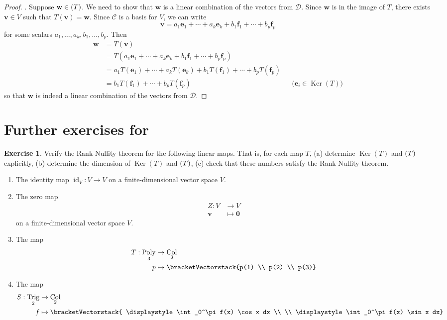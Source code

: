 \documentclass[a4paper,11pt]{book}
\theoremstyle{definition}
\newtheorem{exercise}{Exercise}
\newcommand{\ve}[1]{\mathbf{#1}}
\newcommand{\basis}[1]{{\mathcal #1}}
\newcommand{\cvector}[1]{\bracketVectorstack{#1}}
\newcommand{\furtherexercises}{\section*{Further exercises for \thesection}}
\DeclareMathOperator{\Poly}{Poly}
\DeclareMathOperator{\Trig}{Trig}
\DeclareMathOperator{\Col}{Col}
\DeclareMathOperator{\id}{id}
\DeclareMathOperator{\Ker}{Ker}
\let\Im\relax
\DeclareMathOperator{\Im}{Im} %
\begin{document}
\begin{proof}
\noindent {\em $\basis{D}$ spans $W$}. Suppose $\ve{w} \in \Im(T)$. We need to show that $\ve{w}$ is a linear combination of the vectors from $\basis{D}$. Since $\ve{w}$ is in the image of $T$, there exists $\ve{v} \in V$ such that $T(\ve{v}) = \ve{w}$. Since $\basis{C}$ is a basis for $V$, we can write
\[
 \ve{v} = a_1 \ve{e}_1 + \cdots + a_k \ve{e}_k + b_1 \ve{f}_1 + \cdots + b_p \ve{f}_p
\]
for some scalars $a_1, \ldots, a_k, b_1, \ldots, b_p$. Then
\begin{align*}
 \ve{w} &=   T(\ve{v}) \\
  &= T(a_1 \ve{e}_1 + \cdots + a_k \ve{e}_k + b_1 \ve{f}_1 + \cdots + b_p \ve{f}_p) \\
   &= a_1 T(\ve{e}_1) + \cdots + a_k T(\ve{e}_k) + b_1 T(\ve{f}_1) + \cdots + b_p T(\ve{f}_p) \\
   &= b_1 T(\ve{f}_1) + \cdots + b_p T(\ve{f}_p) && \mbox{($\ve{e}_i \in \Ker(T)$)} 
\end{align*}
so that $\ve{w}$ is indeed a linear combination of the vectors from $\basis{D}$.
\end{proof}

\furtherexercises
\begin{exercise} Verify the Rank-Nullity theorem for the following linear maps. That is, for each map $T$, (a) determine $\Ker(T)$ and $\Im(T)$ explicitly, (b) determine the dimension of $\Ker(T)$ and $\Im(T)$, (c) check that these numbers satisfy the Rank-Nullity theorem. 
\begin{enumerate}
\item The identity map $\id_V : V \rightarrow V$ on a finite-dimensional vector space $V$.
\item The zero map 
\begin{align*}
 Z : V & \rightarrow V \\
  \ve{v} & \mapsto \ve{0}
\end{align*}
on a finite-dimensional vector space $V$.
\item The map \begin{align*} 
 T : \Poly_3 & \rightarrow \Col_3 \\
  p & \mapsto \cvector{p(1) \\ p(2) \\ p(3)}
\end{align*}
\item The map
\begin{align*}
 S : \Trig_2 & \rightarrow \Col_2 \\
  f & \mapsto \cvector{ \displaystyle \int_0^\pi f(x) \cos x dx \\ \\ \displaystyle \int_0^\pi f(x) \sin x dx} 
\end{align*}
\end{enumerate}
\end{exercise}
\end{document}
